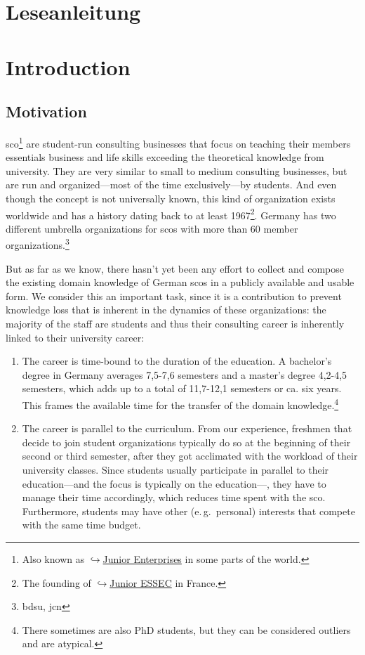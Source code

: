 \documentclass[a4paper, DIV=13, BCOR=0cm]{scrbook}
\newcommand{\eg}{e.\,g.\ }
\newcommand{\link}[2]{\href{#1}{$\hookrightarrow$#2}}
\begin{document}
\chapter*{Leseanleitung}
\newpage

\tableofcontents
\newpage

\mainmatter
\chapter{Introduction }
\section{Motivation }
\gls{sco}\footnote{Also known as \link{https://en.wikipedia.org/wiki/Junior_enterprise}{Junior Enterprises} in some parts of the world.} are student-run consulting businesses that focus on teaching their members essentials business and life skills exceeding the theoretical knowledge from university. They are very similar to small to medium consulting businesses, but are run and organized---most of the time exclusively---by students. And even though the concept is not universally known, this kind of organization exists worldwide and has a history dating back to at least 1967\footnote{The founding of \link{https://www.en.junioressec.com/}{Junior ESSEC} in France.}. Germany has two different umbrella organizations for \glspl{sco} with more than 60 member organizations.\footnote{\gls{bdsu}, \gls{jcn}}

But as far as we know, there hasn't yet been any effort to collect and compose the existing domain knowledge of German \glspl{sco} in a publicly available and usable form. We consider this an important task, since it is a contribution to prevent knowledge loss that is inherent in the dynamics of these organizations: the majority of the staff are students and thus their consulting career is inherently linked to their university career:

\begin{enumerate}
	\item The career is time-bound to the duration of the education. A bachelor's degree in Germany averages 7,5-7,6 semesters and a master's degree 4,2-4,5 semesters, which adds up to a total of 11,7-12,1 semesters or ca. six years. \cite{stabu2019a} This frames the available time for the transfer of the domain knowledge.\footnote{There sometimes are also PhD students, but they can be considered outliers and are atypical.}
	\item The career is parallel to the curriculum. From our experience, freshmen that decide to join student organizations typically do so at the beginning of their second or third semester, after they got acclimated with the workload of their university classes. Since students usually participate in parallel to their education---and the focus is typically on the education---, they have to manage their time accordingly, which reduces time spent with the \gls{sco}. Furthermore, students may have other (\eg personal) interests that compete with the same time budget.
\end{enumerate}
\end{document}
